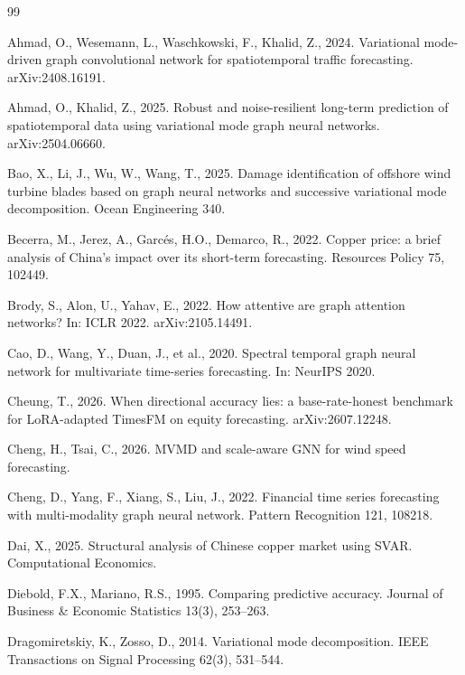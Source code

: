 \documentclass[journal]{IEEEtran}
\begin{document}
\begin{thebibliography}{99}

Ahmad, O., Wesemann, L., Waschkowski, F., Khalid, Z., 2024. Variational mode-driven graph convolutional network for spatiotemporal traffic forecasting. arXiv:2408.16191.

Ahmad, O., Khalid, Z., 2025. Robust and noise-resilient long-term prediction of spatiotemporal data using variational mode graph neural networks. arXiv:2504.06660.

Bao, X., Li, J., Wu, W., Wang, T., 2025. Damage identification of offshore wind turbine blades based on graph neural networks and successive variational mode decomposition. Ocean Engineering 340.

Becerra, M., Jerez, A., Garc\'es, H.O., Demarco, R., 2022. Copper price: a brief analysis of China's impact over its short-term forecasting. Resources Policy 75, 102449.

Brody, S., Alon, U., Yahav, E., 2022. How attentive are graph attention networks? In: ICLR 2022. arXiv:2105.14491.

Cao, D., Wang, Y., Duan, J., et al., 2020. Spectral temporal graph neural network for multivariate time-series forecasting. In: NeurIPS 2020.

Cheung, T., 2026. When directional accuracy lies: a base-rate-honest benchmark for LoRA-adapted TimesFM on equity forecasting. arXiv:2607.12248.

Cheng, H., Tsai, C., 2026. MVMD and scale-aware GNN for wind speed forecasting.

Cheng, D., Yang, F., Xiang, S., Liu, J., 2022. Financial time series forecasting with multi-modality graph neural network. Pattern Recognition 121, 108218.

Dai, X., 2025. Structural analysis of Chinese copper market using SVAR. Computational Economics.

Diebold, F.X., Mariano, R.S., 1995. Comparing predictive accuracy. Journal of Business \& Economic Statistics 13(3), 253--263.

Dragomiretskiy, K., Zosso, D., 2014. Variational mode decomposition. IEEE Transactions on Signal Processing 62(3), 531--544.


\end{thebibliography}
\end{document}

